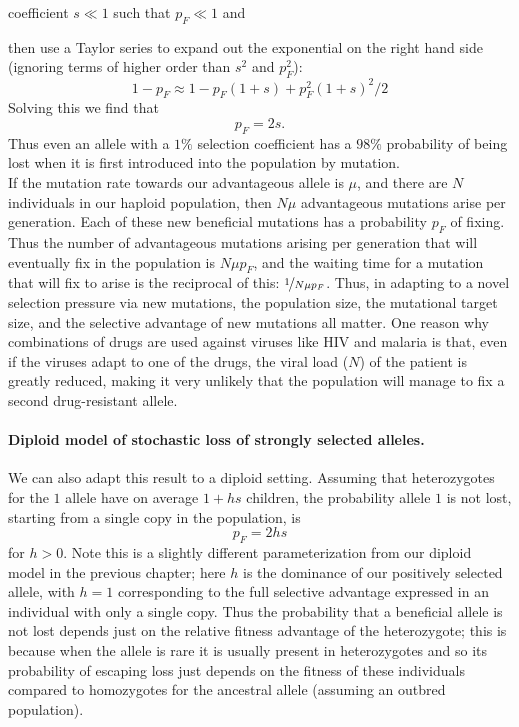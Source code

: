 coefficient $s \ll 1$ such that $p_F \ll 1$ and {then use a Taylor series to expand out the
exponential on the right hand side (ignoring terms of higher
order than $s^2$ and $p_F^2$):
\begin{equation}
1-p_F \approx 1-p_F(1+s)+p_F^2(1+s)^2/2
\end{equation}
Solving this we find that
\begin{equation}
p_F = 2s.
\end{equation}
Thus even an allele with a $1\%$ selection coefficient has a $98\%$
probability of being lost when it is first introduced into the
population by mutation. \\

If the mutation rate towards our advantageous allele is $\mu$, and there
are $N$ individuals in our haploid population, then $N \mu$ advantageous mutations
arise per generation.  Each of these new beneficial mutations has a probability $p_F$ of
fixing. Thus the number of advantageous mutations
arising per generation that will eventually fix in the population is $N \mu p_F$, and
the waiting time for a mutation that will fix to arise is the reciprocal of
this: $\nicefrac{1}{N\mu p_F}$. Thus, in adapting to a novel selection
pressure via new mutations, the population size, the mutational
target size, and the selective advantage of new mutations all matter. One reason why combinations of drugs
are used against viruses like HIV and malaria is that, even if the viruses adapt to one
of the drugs, the viral load ($N$) of the patient is greatly reduced, making it very
unlikely that the population will manage to fix a second drug-resistant allele.

\paragraph{Diploid model of stochastic loss of strongly selected alleles.}
We can also adapt this result to a diploid setting.
Assuming that heterozygotes for the $1$ allele have on average $1+hs$ children, the
probability allele $1$ is not lost, starting from a single copy in
the population, is
\begin{equation}
p_F = 2 h s \label{eqn:diploid_escape}
\end{equation}
for $h>0$. Note this is a slightly different parameterization from
our diploid model in the previous chapter; here $h$ is the dominance of our positively selected
allele, with $h=1$ corresponding to the full selective advantage expressed in an individual with only a single copy. Thus the probability that a beneficial allele is not lost depends just
on the relative fitness advantage of the heterozygote; this is because
when the allele is rare it is usually present in heterozygotes and so
its probability of escaping loss just depends on the fitness of these
individuals compared to homozygotes for the ancestral allele (assuming an
outbred population). \\

}

